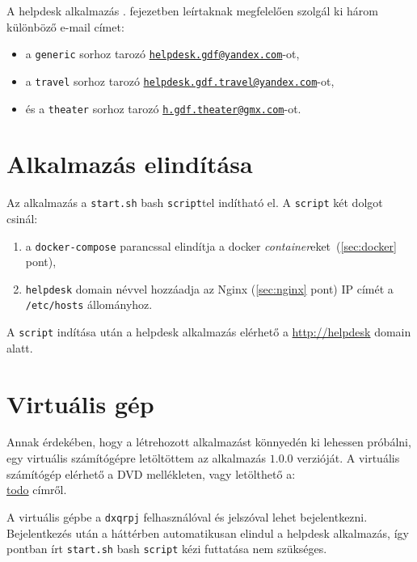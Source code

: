 A helpdesk alkalmazás . fejezetben leírtaknak megfelelően szolgál ki három különböző e-mail címet:

\begin{itemize}
	\item a \texttt{generic} sorhoz tarozó  \href{mailto:helpdesk.gdf@yandex.com}{\nolinkurl{helpdesk.gdf@yandex.com}}-ot, 
	\item a \texttt{travel} sorhoz tarozó  \href{mailto:helpdesk.gdf.travel@yandex.com}{\nolinkurl{helpdesk.gdf.travel@yandex.com}}-ot,
	\item és a \texttt{theater} sorhoz tarozó  \href{mailto:h.gdf.theater@gmx.com}{\nolinkurl{h.gdf.theater@gmx.com}}-ot.
\end{itemize}



\section{Alkalmazás elindítása}\label{sec:elinditas}
Az alkalmazás a \texttt{start.sh} bash \texttt{script}tel indítható el. A \texttt{script} két dolgot csinál:
\begin{enumerate}
	\item a \texttt{docker-compose} parancssal elindítja a docker \emph{container}eket~(\ref{sec:docker} pont),
	\item  \texttt{helpdesk} domain névvel hozzáadja az Nginx (\ref{sec:nginx} pont) IP címét a \mbox{\texttt{/etc/hosts}} állományhoz.
\end{enumerate}

A \texttt{script} indítása után a helpdesk alkalmazás elérhető a \href{http://helpdesk}{http://helpdesk} domain alatt.

\section{Virtuális gép}
Annak érdekében, hogy a létrehozott alkalmazást könnyedén ki lehessen próbálni, egy virtuális számítógépre letöltöttem az alkalmazás $1.0.0$ verzióját. A virtuális számítógép elérhető a DVD mellékleten, vagy letölthető a: \\
\href{http://todo}{todo} címről.

A virtuális gépbe a \texttt{dxqrpj} felhasználóval és jelszóval lehet bejelentkezni. Bejelentkezés után a háttérben automatikusan elindul a helpdesk alkalmazás, így  pontban írt \texttt{start.sh} bash \texttt{script} kézi futtatása nem szükséges.

